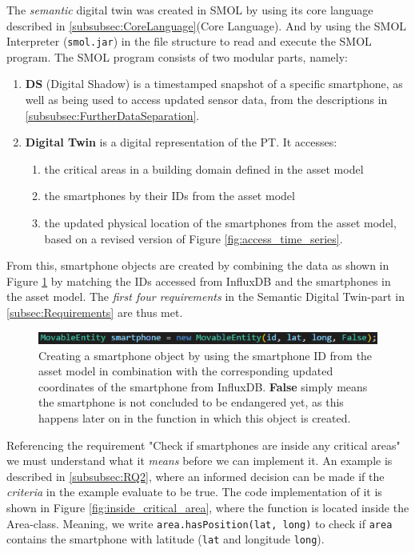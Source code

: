 \documentclass{article}
\begin{document}
The \emph{semantic} digital twin was created in SMOL by using its core language described in \ref{subsubsec:CoreLanguage}(Core Language). And by using the SMOL Interpreter (\verb|smol.jar|) in the file structure to read and execute the SMOL program. The SMOL program consists of two modular parts, namely: 
\begin{enumerate}
    \item \textbf{DS} (Digital Shadow) is a timestamped snapshot of a specific smartphone, as well as being used to access updated sensor data, from the descriptions in \ref{subsubsec:FurtherDataSeparation}.
    \item \textbf{Digital Twin} is a digital representation of the PT. It accesses: 
    \begin{enumerate}
        \item the critical areas in a building domain defined in the asset model
        \item the smartphones by their IDs from the asset model
        \item the updated physical location of the smartphones from the asset model, based on a revised version of Figure \ref{fig:access_time_series}.
    \end{enumerate}
\end{enumerate}

From this, smartphone objects are created by combining the data as shown in Figure \ref{fig:smartphone_object} by matching the IDs accessed from InfluxDB and the smartphones in the asset model. The \emph{first four requirements} in the Semantic Digital Twin-part in \ref{subsec:Requirements} are thus met. 

\begin{figure}[H]
    \centering
    \includegraphics[scale=0.80]{graphics/smartphone_object.png}
    \caption{Creating a smartphone object by using the smartphone ID from the asset model in combination with the corresponding updated coordinates of the smartphone from InfluxDB. \textbf{False} simply means the smartphone is not concluded to be endangered yet, as this happens later on in the function in which this object is created.}
    \label{fig:smartphone_object}
\end{figure}

Referencing the requirement "Check if smartphones are inside any critical areas" we must understand what it \emph{means} before we can implement it. An example is described in \ref{subsubsec:RQ2}, where an informed decision can be made if the \emph{criteria} in the example evaluate to be true. The code implementation of it is shown in Figure \ref{fig:inside_critical_area}, where the function is located inside the Area-class. Meaning, we write \verb|area.hasPosition(lat, long)| to check if \verb|area| contains the smartphone with latitude (\verb|lat| and longitude \verb|long|).
\end{document}
